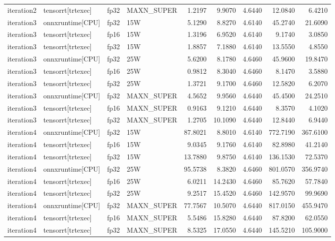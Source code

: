 \begin{table}
\begin{tabular}{llllrrrrr}
iteration2 & tensorrt[trtexec] & fp32 & MAXN\_SUPER & 1.2197 & 9.9070 & 4.6440 & 12.0840 & 6.4210 \\
iteration3 & onnxruntime[CPU] & fp32 & 15W & 5.1290 & 8.8270 & 4.6140 & 45.2740 & 21.6090 \\
iteration3 & tensorrt[trtexec] & fp16 & 15W & 1.3196 & 6.9520 & 4.6140 & 9.1740 & 3.0850 \\
iteration3 & tensorrt[trtexec] & fp32 & 15W & 1.8857 & 7.1880 & 4.6140 & 13.5550 & 4.8550 \\
iteration3 & onnxruntime[CPU] & fp32 & 25W & 5.6200 & 8.1780 & 4.6460 & 45.9600 & 19.8470 \\
iteration3 & tensorrt[trtexec] & fp16 & 25W & 0.9812 & 8.3040 & 4.6460 & 8.1470 & 3.5880 \\
iteration3 & tensorrt[trtexec] & fp32 & 25W & 1.3721 & 9.1700 & 4.6460 & 12.5820 & 6.2070 \\
iteration3 & onnxruntime[CPU] & fp32 & MAXN\_SUPER & 4.5652 & 9.9560 & 4.6440 & 45.4500 & 24.2510 \\
iteration3 & tensorrt[trtexec] & fp16 & MAXN\_SUPER & 0.9163 & 9.1210 & 4.6440 & 8.3570 & 4.1020 \\
iteration3 & tensorrt[trtexec] & fp32 & MAXN\_SUPER & 1.2705 & 10.1090 & 4.6440 & 12.8440 & 6.9440 \\
iteration4 & onnxruntime[CPU] & fp32 & 15W & 87.8021 & 8.8010 & 4.6140 & 772.7190 & 367.6100 \\
iteration4 & tensorrt[trtexec] & fp16 & 15W & 9.0345 & 9.1760 & 4.6140 & 82.8980 & 41.2140 \\
iteration4 & tensorrt[trtexec] & fp32 & 15W & 13.7880 & 9.8750 & 4.6140 & 136.1530 & 72.5370 \\
iteration4 & onnxruntime[CPU] & fp32 & 25W & 95.5738 & 8.3820 & 4.6460 & 801.0570 & 356.9740 \\
iteration4 & tensorrt[trtexec] & fp16 & 25W & 6.0211 & 14.2430 & 4.6460 & 85.7620 & 57.7840 \\
iteration4 & tensorrt[trtexec] & fp32 & 25W & 9.2517 & 15.4520 & 4.6460 & 142.9570 & 99.9690 \\
iteration4 & onnxruntime[CPU] & fp32 & MAXN\_SUPER & 77.7567 & 10.5070 & 4.6440 & 817.0150 & 455.9470 \\
iteration4 & tensorrt[trtexec] & fp16 & MAXN\_SUPER & 5.5486 & 15.8280 & 4.6440 & 87.8200 & 62.0550 \\
iteration4 & tensorrt[trtexec] & fp32 & MAXN\_SUPER & 8.5325 & 17.0550 & 4.6440 & 145.5210 & 105.9000 \\

\end{tabular}
\end{table}
